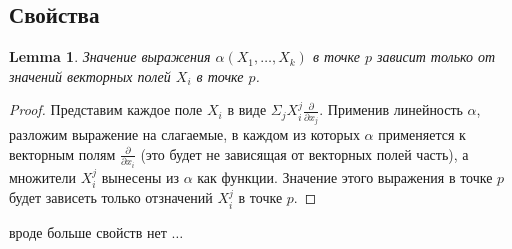 \documentclass[a4paper,12pt]{article} %
\newtheorem{lemma}[theorem]{Lemma}
\theoremstyle{definition}
\begin{document}
\subsection{Свойства}
\begin{lemma}
	Значение выражения $\alpha(X_1,\dots,X_k)$ в точке $p$ зависит только от значений векторных полей $X_i$ в точке $p$.
\end{lemma}
\begin{proof}
	Представим каждое поле $X_i$ в виде $\Sigma_j X^j_i \frac{\partial}{\partial x_j}$. Применив линейность $\alpha$, разложим выражение на слагаемые, в каждом из которых $\alpha$ применяется к векторным полям $\frac{\partial}{\partial x_i}$ (это будет не зависящая от векторных полей часть), а множители $X^j_i$ вынесены из $\alpha$ как функции. Значение этого выражения в точке $p$ будет зависеть только отзначений $X^j_i$ в точке $p$.
\end{proof}
вроде больше свойств нет $\dots$
\end{document}
